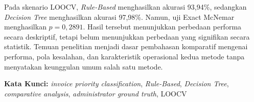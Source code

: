 Pada skenario LOOCV, \textit{Rule-Based} menghasilkan akurasi 93,94\%, sedangkan \textit{Decision Tree} menghasilkan akurasi 97,98\%. Namun, uji Exact McNemar menghasilkan \(p = 0{,}2891\). Hasil tersebut menunjukkan perbedaan performa secara deskriptif, tetapi belum menunjukkan perbedaan yang signifikan secara statistik. Temuan penelitian menjadi dasar pembahasan komparatif mengenai performa, pola kesalahan, dan karakteristik operasional kedua metode tanpa menyatakan keunggulan umum salah satu metode.

\vspace{0.5 cm} \begin{flushleft} {\textbf{Kata Kunci:}} \textit{invoice priority classification}, \textit{Rule-Based}, \textit{Decision Tree}, \textit{comparative analysis}, \textit{administrator ground truth}, LOOCV \end{flushleft}
